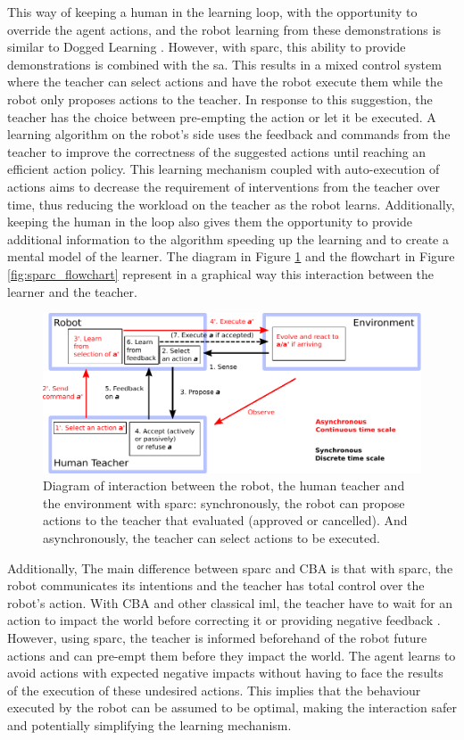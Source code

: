 This way of keeping a human in the learning loop, with the opportunity to override the agent actions, and the robot learning from these demonstrations is similar to Dogged Learning \citep{grollman2007dogged}. However, with \gls{sparc}, this ability to provide demonstrations is combined with the \gls{sa}. This results in a mixed control system where the teacher can select actions and have the robot execute them while the robot only proposes actions to the teacher. In response to this suggestion, the teacher has the choice between pre-empting the action or let it be executed. A learning algorithm on the robot's side uses the feedback and commands from the teacher to improve the correctness of the suggested actions until reaching an efficient action policy. This learning mechanism coupled with auto-execution of actions aims to decrease the requirement of interventions from the teacher over time, thus reducing the workload on the teacher as the robot learns. Additionally, keeping the human in the loop also gives them the opportunity to provide additional information to the algorithm speeding up the learning and to create a mental model of the learner. The diagram in Figure \ref{fig:sparc_diagram} and the flowchart in Figure \ref{fig:sparc_flowchart} represent in a graphical way this interaction between the learner and the teacher.

\begin{figure}[ht]
	\includegraphics[width=1\linewidth]{diagram.pdf}
	\centering
	\caption{Diagram of interaction between the robot, the human teacher and the environment with \gls{sparc}: synchronously, the robot can propose actions to the teacher that evaluated (approved or cancelled). And asynchronously, the teacher can select actions to be executed.}
	\label{fig:sparc_diagram}
\end{figure}

Additionally, The main difference between \gls{sparc} and CBA \citep{chernova2009interactive} is that with \gls{sparc}, the robot communicates its intentions and the teacher has total control over the robot's action. With CBA and other classical \gls{iml}, the teacher have to wait for an action to impact the world before correcting it or providing negative feedback \citep{thomaz2008teachable,knox2009interactively}. However, using \gls{sparc}, the teacher is informed beforehand of the robot future actions and can pre-empt them before they impact the world. The agent learns to avoid actions with expected negative impacts without having to face the results of the execution of these undesired actions. This implies that the behaviour executed by the robot can be assumed to be optimal, making the interaction safer and potentially simplifying the learning mechanism.

